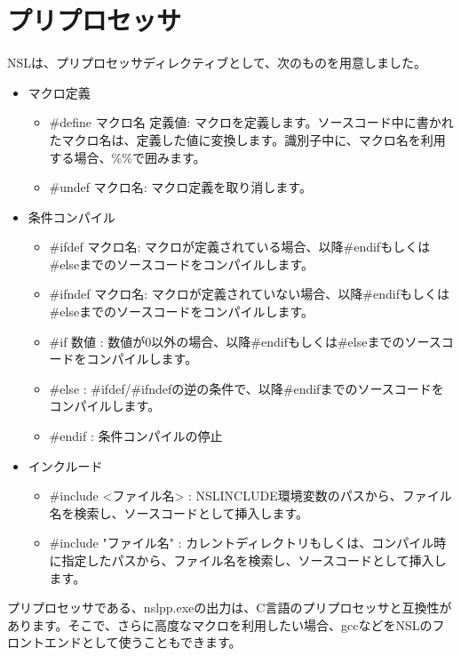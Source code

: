 \chapter{プリプロセッサ}
\label{chap:preprocessor}

NSLは、プリプロセッサディレクティブとして、次のものを用意しました。

\begin{itemize}
\item マクロ定義

\begin{itemize}
\item \#define マクロ名 定義値: マクロを定義します。ソースコード中に書かれたマクロ名は、定義した値に変換します。識別子中に、マクロ名を利用する場合、\%\%で囲みます。
\item \#undef マクロ名:  マクロ定義を取り消します。
\end{itemize}

\item 条件コンパイル

\begin{itemize}
\item \#ifdef マクロ名: マクロが定義されている場合、以降\#endifもしくは\#elseまでのソースコードをコンパイルします。
\item \#ifndef マクロ名: マクロが定義されていない場合、以降\#endifもしくは\#elseまでのソースコードをコンパイルします。
\item \#if 数値 : 数値が0以外の場合、以降\#endifもしくは\#elseまでのソースコードをコンパイルします。
\item \#else : \#ifdef/\#ifndefの逆の条件で、以降\#endifまでのソースコードをコンパイルします。
\item \#endif : 条件コンパイルの停止
\end{itemize}

\item インクルード

\begin{itemize}
\item \#include \textless{}ファイル名\textgreater{} : NSL\textunderscore{}INCLUDE環境変数のパスから、ファイル名を検索し、ソースコードとして挿入します。
\item \#include "ファイル名" : カレントディレクトリもしくは、コンパイル時に指定したパスから、ファイル名を検索し、ソースコードとして挿入します。
\end{itemize}

\end{itemize}

プリプロセッサである、nslpp.exeの出力は、C言語のプリプロセッサと互換性があります。そこで、さらに高度なマクロを利用したい場合、gccなどをNSLのフロントエンドとして使うこともできます。
